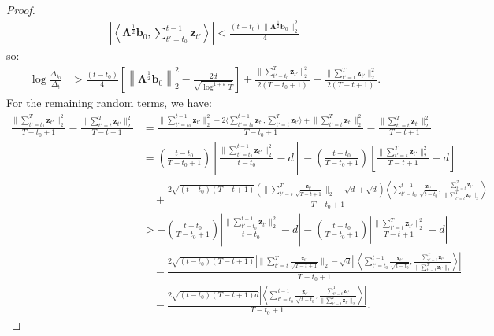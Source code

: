 \begin{proof}
\begin{align*}
    \left|\left\langle\boldsymbol{\Lambda}^{\frac{1}{2}}\mathbf{b}_0, \sum_{t'=t_0}^{t-1}\mathbf{z}_{t'} \right\rangle\right| < \frac{(t-t_0) \lVert\boldsymbol{\Lambda}^{\frac{1}{2}} \mathbf{b}_0\rVert_2^2}{4}
\end{align*}
so:
\begin{align*}
    \log \frac{\Delta_{t_0}}{\Delta_t} &> \frac{(t-t_0)}{4}\left[\left\lVert\boldsymbol{\Lambda}^{\frac{1}{2}}\mathbf{b}_0\right\rVert_2^2 - \frac{2d}{\sqrt{\log^{1+\varepsilon}  T}}\right] + \frac{\lVert\sum_{t'=t_0}^T\mathbf{z}_{t'}\rVert_2^2}{2(T-t_0+1)} - \frac{\lVert\sum_{t'=t}^T\mathbf{z}_{t'}\rVert_2^2}{2(T-t+1)}. 
\end{align*}
For the remaining random terms, we have:
\small
\begin{align*}
    \frac{\lVert\sum_{t'=t_0}^T\mathbf{z}_{t'}\rVert_2^2}{T-t_0+1} - \frac{\lVert\sum_{t'=t}^T\mathbf{z}_{t'}\rVert_2^2}{T-t+1} &=
    \frac{\lVert\sum_{t'=t_0}^{t-1}\mathbf{z}_{t'}\rVert_2^2 + 2\langle \sum_{t'=t_0}^{t-1}\mathbf{z}_{t'}, \sum_{t'=t}^{T}\mathbf{z}_{t'}\rangle + \lVert\sum_{t'=t}^{T}\mathbf{z}_{t'}\rVert_2^2}{T-t_0+1}  - \frac{\lVert\sum_{t'=t}^T\mathbf{z}_{t'}\rVert_2^2}{T-t+1} \\
    &= \left(\frac{t-t_0}{T-t_0+1}\right)\left[\frac{\lVert\sum_{t'=t_0}^{t-1}\mathbf{z}_{t'}\rVert_2^2}{t-t_0} - d\right] - \left(\frac{t-t_0}{T-t_0+1}\right)\left[\frac{\lVert\sum_{t'=t}^T\mathbf{z}_{t'}\rVert_2^2}{T-t+1} -d \right] \\
    &\quad +\frac{2\sqrt{(t-t_0)(T-t+1)}\left(\lVert\sum_{t'=t}^{T}\frac{\mathbf{z}_{t'}}{\sqrt{T-t+1}}\rVert_2 -\sqrt{d} + \sqrt{d}\right)\left\langle \sum_{t'=t_0}^{t-1}\frac{\mathbf{z}_{t'}}{\sqrt{t-t_0}}, \frac{\sum_{t'=t}^{T}\mathbf{z}_{t'}}{\lVert\sum_{t'=t}^{T}\mathbf{z}_{t'}\rVert_2}\right\rangle}{T-t_0+1} \\
    &> -\left(\frac{t-t_0}{T-t_0+1}\right)\left|\frac{\lVert\sum_{t'=t_0}^{t-1}\mathbf{z}_{t'}\rVert_2^2}{t-t_0} - d\right| - \left(\frac{t-t_0}{T-t_0+1}\right)\left|\frac{\lVert\sum_{t'=t}^T\mathbf{z}_{t'}\rVert_2^2}{T-t+1} -d \right| \\
    &\quad -\frac{2\sqrt{(t-t_0)(T-t+1)}\left|\lVert\sum_{t'=t}^{T}\frac{\mathbf{z}_{t'}}{\sqrt{T-t+1}}\rVert_2 -\sqrt{d}\right|\left|\left\langle \sum_{t'=t_0}^{t-1}\frac{\mathbf{z}_{t'}}{\sqrt{t-t_0}}, \frac{\sum_{t'=t}^{T}\mathbf{z}_{t'}}{\lVert\sum_{t'=t}^{T}\mathbf{z}_{t'}\rVert_2}\right\rangle\right|}{T-t_0+1} \\
    &\quad-\frac{2\sqrt{(t-t_0)(T-t+1)d}\left|\left\langle \sum_{t'=t_0}^{t-1}\frac{\mathbf{z}_{t'}}{\sqrt{t-t_0}}, \frac{\sum_{t'=t}^{T}\mathbf{z}_{t'}}{\lVert\sum_{t'=t}^{T}\mathbf{z}_{t'}\rVert_2}\right\rangle\right|}{T-t_0+1}.

\end{align*}
\end{proof}

